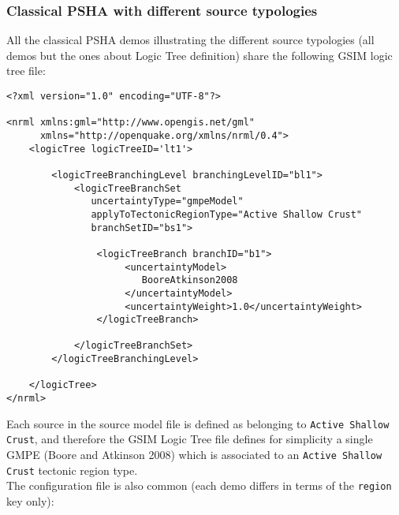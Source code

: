 \subsubsection{Classical PSHA with different source typologies}
All the classical PSHA demos illustrating the different source typologies (all demos but the ones about Logic Tree definition)
share the following GSIM logic tree file:
\begin{Verbatim}[frame=single, commandchars=\\\{\}, fontsize=\normalsize]
<?xml version="1.0" encoding="UTF-8"?>

<nrml xmlns:gml="http://www.opengis.net/gml"
      xmlns="http://openquake.org/xmlns/nrml/0.4">
    <logicTree logicTreeID='lt1'>

        <logicTreeBranchingLevel branchingLevelID="bl1">
            <logicTreeBranchSet
               uncertaintyType="gmpeModel"
               applyToTectonicRegionType="Active Shallow Crust"
               branchSetID="bs1">

                <logicTreeBranch branchID="b1">
                     <uncertaintyModel>
                        BooreAtkinson2008
                     </uncertaintyModel>
                     <uncertaintyWeight>1.0</uncertaintyWeight>
                </logicTreeBranch>

            </logicTreeBranchSet>
        </logicTreeBranchingLevel>

    </logicTree>
</nrml>
\end{Verbatim}
Each source in the source model file is defined as belonging to \texttt{Active Shallow Crust}, and therefore the GSIM Logic Tree file
defines for simplicity a single GMPE (Boore and Atkinson 2008) which is associated to an \texttt{Active Shallow Crust} tectonic region type.\\
The configuration file is also common (each demo differs in terms of the \texttt{region} key only):
